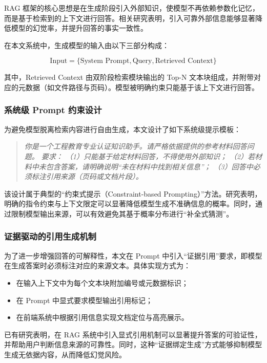 \documentclass[UTF8,a4paper,zihao=-4]{ctexart}
\begin{document}
RAG 框架的核心思想是在生成阶段引入外部知识，使模型不再依赖参数化记忆，而是基于检索到的上下文进行回答。相关研究表明，引入可靠外部信息能够显著降低模型的幻觉率，并提升回答的事实一致性。

在本文系统中，生成模型的输入由以下三部分构成：

\begin{equation}
\text{Input} = \{\text{System Prompt}, \text{Query}, \text{Retrieved Context}\}
\end{equation}

其中，Retrieved Context 由双阶段检索模块输出的 Top-N 文本块组成，并附带对应的元数据（如文件路径与页码）。模型被明确约束只能基于该上下文进行回答。

\subsubsection{系统级 Prompt 约束设计}

为避免模型脱离检索内容进行自由生成，本文设计了如下系统级提示模板：

\begin{quote}
\itshape
你是一个工程教育专业认证知识助手。请严格依据提供的参考材料回答问题。  
要求：  
（1）只能基于给定材料回答，不得使用外部知识；  
（2）若材料中未包含答案，请明确说明“未在材料中找到相关信息”；  
（3）回答中必须标注引用来源（页码或文档片段）。  
\end{quote}

该设计属于典型的“约束式提示（Constraint-based Prompting）”方法。研究表明，明确的指令约束与上下文限定可以显著降低模型生成不准确信息的概率。同时，通过限制模型输出来源，可以有效避免其基于概率分布进行“补全式猜测”。

\subsubsection{证据驱动的引用生成机制}

为了进一步增强回答的可解释性，本文在 Prompt 中引入“证据引用”要求，即模型在生成答案时必须标注对应的来源文本。具体实现方式为：

\begin{itemize}
    \item 在输入上下文中为每个文本块附加编号或元数据标识；
    \item 在 Prompt 中显式要求模型输出引用标记；
    \item 在前端系统中根据引用信息实现文档定位与高亮展示。
\end{itemize}

已有研究表明，在 RAG 系统中引入显式引用机制可以显著提升答案的可验证性，并帮助用户判断信息来源的可靠性。同时，这种“证据绑定生成”方式能够抑制模型生成无依据内容，从而降低幻觉风险。
\end{document}

